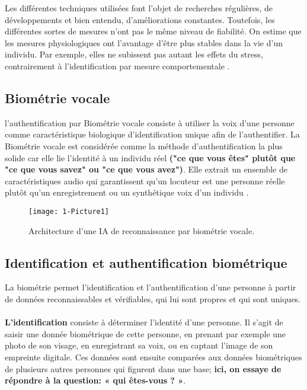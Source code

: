 Les différentes techniques utilisées font l'objet de recherches régulières, de développements et bien entendu, d'améliorations constantes.
Toutefois, les différentes sortes de mesures n'ont pas le même niveau de fiabilité.
On estime que les mesures physiologiques ont l'avantage d'être plus stables dans la vie d'un individu.
Par exemple, elles ne subissent pas autant les effets du stress, contrairement à l'identification par mesure comportementale \cite{idemia}.

\subsection{Biométrie vocale}
l'authentification par Biométrie vocale consiste à utiliser la voix d'une personne comme caractéristique biologique d'identification unique afin de l'authentifier.
La Biométrie vocale est considérée comme la méthode d'authentification la plus solide car elle lie l'identité à un individu réel \textbf{("ce que vous êtes" plutôt que "ce que vous savez" ou "ce que vous avez")}.
Elle  extrait un ensemble de caractéristiques audio qui garantissent qu'un locuteur est une personne réelle plutôt qu'un enregistrement ou un synthétique voix d'un individu \cite{nice}.
\begin{figure}[ht]
    \centering
    \texttt{[image: 1-Picture1]}
    \caption{Architecture d'une IA de reconnaissance par biométrie vocale.}
    \label{fig:1-Picture1}
\end{figure}

\subsection{Identification et authentification biométrique}
La biométrie permet l'identification et l'authentification d'une personne à partir de données reconnaissables et vérifiables, qui lui sont propres et qui sont uniques.
\paragraph{}\textbf{L'identification }consiste à déterminer l'identité d'une personne.
Il s'agit de saisir une donnée biométrique de cette personne, en prenant par exemple une photo de son visage, en enregistrant sa voix, ou en captant l'image de son empreinte digitale. Ces données sont ensuite comparées aux données biométriques de plusieurs autres personnes qui figurent dans une base; \textbf{ ici, on essaye de répondre à la question: « qui êtes-vous ? »}.
